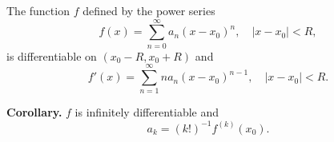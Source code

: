 The function $f$ defined by the power series
$$f(x) = \sum_{n=0}^{\infty} a_n (x - x_0)^n, \quad |x - x_0| < R,$$
is differentiable on $(x_0 - R, x_0 + R)$ and
$$f'(x) = \sum_{n=1}^{\infty} n a_n (x - x_0)^{n-1}, \quad |x - x_0| < R.$$

\textbf{Corollary.} $f$ is infinitely differentiable and
$$a_k = (k!)^{-1} f^{(k)}(x_0).$$
